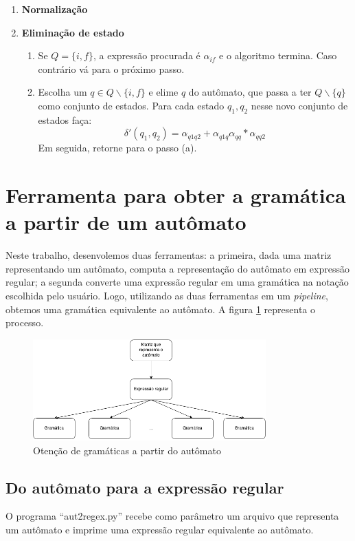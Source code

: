 \documentclass[a4 paper, 12pt]{article}
\begin{document}
\begin{enumerate}
\item \textbf{Normaliza\c c\~ao}
\item \textbf{Elimina\c c\~ao de estado}
  \begin{enumerate}
  \item Se $Q=\{i,f\}$, a express\~ao procurada \'e $\alpha_{if}$ e o
    algoritmo termina. Caso contr\'ario v\'a para o pr\'oximo passo.
  \item Escolha um $q \in Q \backslash\{i,f\}$ e elime $q$ do aut\^omato, que
    passa a ter $Q \backslash \{q\}$ como conjunto de estados. Para cada estado
    $q_1, q_2$ nesse novo conjunto de estados fa\c ca:
    \begin{equation*}
      \delta'(q_1, q_2)=\alpha_{q1q2} + \alpha_{q1q}\alpha_{qq}*\alpha_{qq2}
    \end{equation*}
    Em seguida, retorne para o passo (a).
  \end{enumerate}
\end{enumerate}


\section{Ferramenta para obter a gram\'atica a partir de um
  aut\^omato}
Neste trabalho, desenvolemos duas ferramentas: a primeira, dada uma
matriz representando um aut\^omato, computa a representa\c c\~ao do
aut\^omato em express\~ao regular; a segunda converte uma express\~ao
regular em uma gram\'atica na nota\c c\~ao escolhida pelo
usu\'ario. Logo, utilizando as duas ferramentas em um
\emph{pipeline}, obtemos uma gram\'atica equivalente ao aut\^omato. A
figura \ref{fig:1} representa o processo.

\begin{figure}[H]
  \centering
  \includegraphics[width=0.8\textwidth]{estruturabranco.png}
  \caption{Oten\c c\~ao de gram\'aticas a partir do aut\^omato}
  \label{fig:1}
\end{figure}

\subsection{Do aut\^omato para a express\~ao regular}
O programa ``aut2regex.py'' recebe como par\^ametro um arquivo que
representa um aut\^omato e imprime uma express\~ao regular equivalente
ao aut\^omato.
\end{document}
